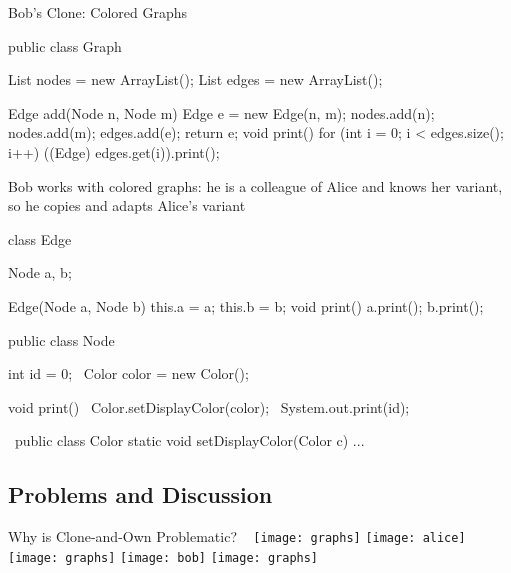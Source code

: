 \begin{frame}[fragile]{Bob's Clone: Colored Graphs}
	\begin{mycolumns}[b,columns=3,widths={43,26}]
\begin{codetight}{}
public class Graph {
	List nodes = new ArrayList();
	List edges = new ArrayList();

	Edge add(Node n, Node m) {
		Edge e = new Edge(n, m);
		nodes.add(n); nodes.add(m); edges.add(e);
		return e;
	}
	void print() {
		for (int i = 0; i < edges.size(); i++) {
			((Edge) edges.get(i)).print();
		}
	}
}
\end{codetight}
	\mynextcolumn
		\begin{example}{}
			Bob works with colored graphs: he is a colleague of Alice and knows her variant, so he copies and adapts Alice's variant
		\end{example}
\begin{codetight}{}
class Edge {
	Node a, b;

	Edge(Node a, Node b) {
		this.a = a; this.b = b;
	}
	void print() {
		a.print(); b.print();
	}
}
\end{codetight}
	\mynextcolumn
\begin{codetight}{}
public class Node {
	int id = 0;
	~Color color = new Color();~

	void print() {
		~Color.setDisplayColor(color);~
		System.out.print(id);
	}
}
\end{codetight}
\begin{codetight}{}
~public class Color {
	static void setDisplayColor(Color c) {...}
}~
\end{codetight}
	\end{mycolumns}
\end{frame}

\subsection{Problems and Discussion}

\begin{frame}{Why is Clone-and-Own Problematic?}
	~\hfill
	\texttt{[image: graphs]}
	\hfill
	\texttt{[image: alice]}%
	\texttt{[image: graphs]}
	\hfill
	\texttt{[image: bob]}%
	\texttt{[image: graphs]}
	\hfill~
\end{frame}

